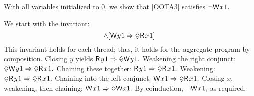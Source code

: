 \begin{example}
\label{ex:thin}
With all variables initialized to $0$, we show that \ref{OOTA3}
satisfies
\begin{math}
  \lnot\DW{x}{1}.
\end{math}

We start with the invariant:
\begin{displaymath}
  [\DW{x}{1}\Rightarrow\once\DR{y}{1}]
  \land
  [\DW{y}{1}\Rightarrow\once\DR{x}{1}]
\end{displaymath}
This invariant holds for each thread; thus, it holds for the
aggregate program by composition.  Closing $y$ yields
\begin{math}
  \DR{y}{1} \Rightarrow \once\DW{y}{1}.
\end{math}
Weakening the right conjunct: %
\begin{math}
  \once\DW{y}{1}\Rightarrow\once\DR{x}{1}.
\end{math}
Chaining these together: %
\begin{math}
  \DR{y}{1} \Rightarrow \once\DR{x}{1}.
\end{math}
Weakening:  %
\begin{math}
  \once\DR{y}{1} \allowbreak\Rightarrow \once\DR{x}{1}. 
\end{math}
Chaining into the left conjunct:  %
\begin{math}
  \DW{x}{1} \Rightarrow \once\DR{x}{1}. 
\end{math}
Closing $x$, 
weakening, 
then chaining: %
\begin{math}
  \DW{x}{1} \Rightarrow \once\DW{x}{1}. 
\end{math}
By coinduction, 
\begin{math}
  \lnot\DW{x}{1},
\end{math}
as required.
\end{example}


